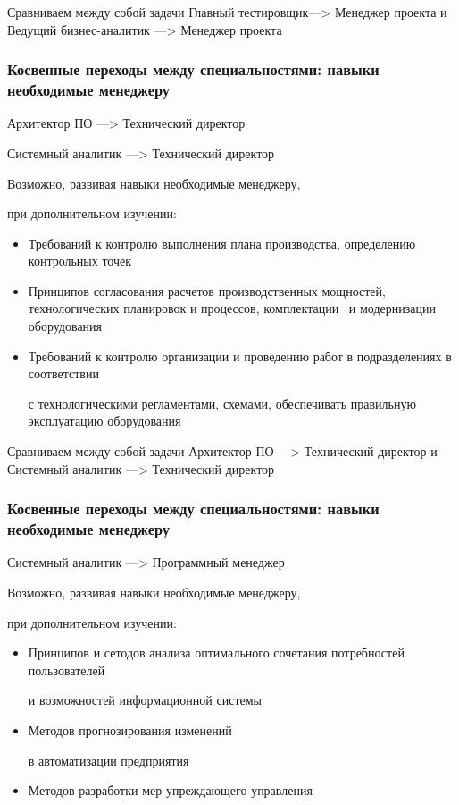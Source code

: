 \documentclass{../industrial-development}
\begin{document}
\lecturenotes

Сравниваем между собой задачи Главный тестировщик---> Менеджер проекта и
 Ведущий бизнес-аналитик ---> Менеджер проекта


\begin{frame} \frametitle{Косвенные переходы между специальностями: навыки необходимые менеджеру}

\begin{block}{Архитектор ПО  ---> Технический директор  

Системный аналитик ---> Технический директор }

Возможно, развивая навыки необходимые менеджеру, 

при дополнительном изучении:
  \end{block}
  \begin{itemize}
  \item Требований к контролю выполнения плана производства, определению контрольных точек
 \item Принципов согласования расчетов производственных мощностей, технологических планировок и  процессов, комплектации ~и модернизации оборудования 
 \item Требований к контролю организации и проведению работ в  подразделениях в соответствии 

с технологическими регламентами, схемами, обеспечивать правильную эксплуатацию оборудования 
  \end{itemize}
\end{frame}



\lecturenotes
Сравниваем между собой задачи Архитектор ПО  ---> Технический директор  и
Системный аналитик ---> Технический директор


\begin{frame} \frametitle{Косвенные переходы между специальностями: навыки необходимые менеджеру}

\begin{block}{Системный аналитик ---> Программный менеджер}

Возможно, развивая навыки необходимые менеджеру, 

при дополнительном изучении:
  \end{block}
\begin{itemize}
\item Принципов и сетодов анализа оптимального сочетания потребностей пользователей 

и возможностей информационной системы
\item Методов прогнозирования изменений 

в автоматизации предприятия
 \item Методов разработки мер упреждающего управления
\end{itemize}

\end{frame}
\end{document}
